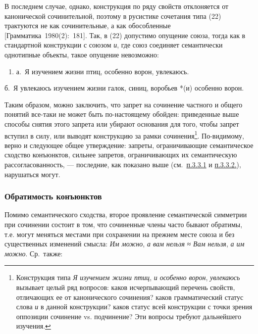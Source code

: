 В последнем случае, однако, конструкция по ряду свойств отклоняется от
канонической сочинительной, поэтому в русистике сочетания типа (22)
трактуются не как сочинительные, а как обособленные
{[}Грамматика~1980(2):~181{]}. Так, в (22) допустимо опущение союза,
тогда как в стандартной конструкции с союзом \textit{и}, где союз
соединяет семантически однотипные объекты, такое опущение невозможно:

\begin{enumerate}
  \def\labelenumi{(\arabic{enumi})}
  \setcounter{enumi}{22}
  \item
        а.~Я изучением жизни птиц, особенно ворон, увлекаюсь.
\end{enumerate}

б.~Я увлекаюсь изучением жизни галок, синиц, воробьев *(и) особенно
ворон.

Таким образом, можно заключить, что запрет на сочинение частного и
общего понятий все-таки не может быть по-настоящему обойден: приведенные
выше способы снятия этого запрета или убирают основания для того, чтобы
запрет вступил в силу, или выводят конструкцию за рамки
сочинения\footnote{Конструкция типа \textit{Я изучением жизни птиц},
  \textit{и особенно ворон}, \textit{увлекаюсь} вызывает целый ряд вопросов:
  каков исчерпывающий перечень свойств, отличающих ее от канонического
  сочинения? каков грамматический статус слова \textit{и} в данной
  конструкции? каков статус всей конструкции с точки зрения оппозиции
  сочинение vs. подчинение? Эти вопросы требуют дальнейшего изучения.}.
По-видимому, верно и следующее общее утверждение: запреты,
ограничивающие семантическое сходство конъюнктов, сильнее запретов,
ограничивающих их семантическую рассогласованность, --- последние, как
показано выше (см.~\underline{п.3.3.1} и \underline{п.3.3.2.}),
нарушаться могут.

\subsubsection{Обратимость
  конъюнктов}\label{ux43eux431ux440ux430ux442ux438ux43cux43eux441ux442ux44c-ux43aux43eux43dux44aux44eux43dux43aux442ux43eux432}

Помимо семантического сходства, второе проявление семантической
симметрии при сочинении состоит в том, что сочиненные члены часто бывают
обратимы, т.е. могут меняться местами при сохранении на прежнем месте
союза и без существенных изменений смысла: \textit{Им можно}, \textit{а вам
  нельзя} ≈ \textit{Вам нельзя}, \textit{а им можно}. Ср.~также:

